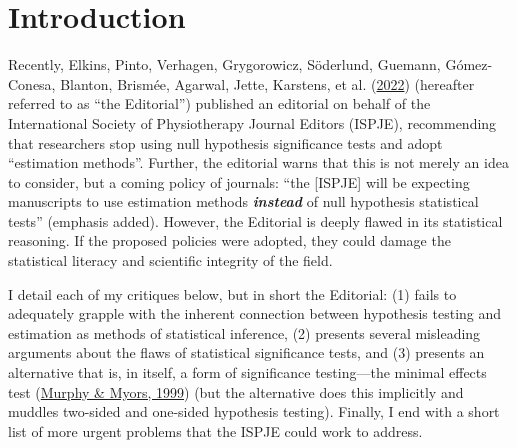 \documentclass[]{cik}%
\begin{document}
\providecommand{\tightlist}{%
  \setlength{\itemsep}{0pt}\setlength{\parskip}{0pt}}
\providecommand{\EndFirstPage}{%
}


\maketitle

\newpage

\hypertarget{introduction}{%
\section{Introduction}\label{introduction}}

Recently, Elkins, Pinto, Verhagen, Grygorowicz, Söderlund, Guemann,
Gómez-Conesa, Blanton, Brismée, Agarwal, Jette, Karstens, et al.
(\protect\hyperlink{ref-1}{2022}) (hereafter referred to as ``the
Editorial'') published an editorial on behalf of the International
Society of Physiotherapy Journal Editors (ISPJE), recommending that
researchers stop using null hypothesis significance tests and adopt
``estimation methods''. Further, the editorial warns that this is not
merely an idea to consider, but a coming policy of journals: ``the
{[}ISPJE{]} will be expecting manuscripts to use estimation methods
\textbf{\emph{instead}} of null hypothesis statistical tests'' (emphasis
added). However, the Editorial is deeply flawed in its statistical
reasoning. If the proposed policies were adopted, they could damage the
statistical literacy and scientific integrity of the field.

I detail each of my critiques below, but in short the Editorial: (1)
fails to adequately grapple with the inherent connection between
hypothesis testing and estimation as methods of statistical inference,
(2) presents several misleading arguments about the flaws of statistical
significance tests, and (3) presents an alternative that is, in itself,
a form of significance testing---the minimal effects test
(\protect\hyperlink{ref-2}{Murphy \& Myors, 1999}) (but the alternative
does this implicitly and muddles two-sided and one-sided hypothesis
testing). Finally, I end with a short list of more urgent problems that
the ISPJE could work to address.
\end{document}
